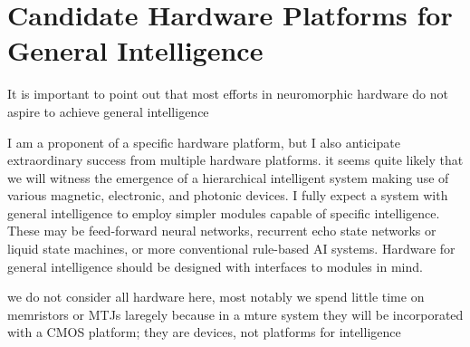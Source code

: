 \section{\label{sec:hardware}Candidate Hardware Platforms for General Intelligence}

\vspace{3em}
It is important to point out that most efforts in neuromorphic hardware do not aspire to achieve general intelligence

\vspace{3em}
I am a proponent of a specific hardware platform, but I also anticipate extraordinary success from multiple hardware platforms. it seems quite likely that we will witness the emergence of a hierarchical intelligent system making use of various magnetic, electronic, and photonic devices. I fully expect a system with general intelligence to employ simpler modules capable of specific intelligence. These may be feed-forward neural networks, recurrent echo state networks or liquid state machines, or more conventional rule-based AI systems. Hardware for general intelligence should be designed with interfaces to modules in mind.

\vspace{3em}
we do not consider all hardware here, most notably we spend little time on memristors or MTJs laregely because in a mture system they will be incorporated with a CMOS platform; they are devices, not platforms for intelligence
















